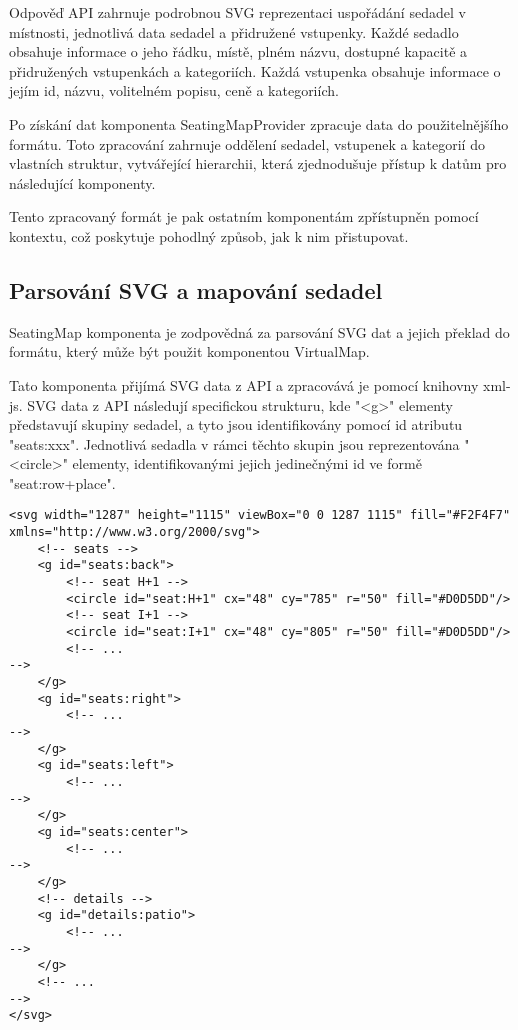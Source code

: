 Odpověď API zahrnuje podrobnou SVG reprezentaci uspořádání sedadel v místnosti, jednotlivá data sedadel a přidružené vstupenky.
Každé sedadlo obsahuje informace o jeho řádku, místě, plném názvu, dostupné kapacitě a přidružených vstupenkách a kategoriích.
Každá vstupenka obsahuje informace o jejím id, názvu, volitelném popisu, ceně a kategoriích.

Po získání dat komponenta SeatingMapProvider zpracuje data do použitelnějšího formátu.
Toto zpracování zahrnuje oddělení sedadel, vstupenek a kategorií do vlastních struktur, vytvářející hierarchii, která zjednodušuje přístup k datům pro následující komponenty.

Tento zpracovaný formát je pak ostatním komponentám zpřístupněn pomocí kontextu, což poskytuje pohodlný způsob, jak k nim přistupovat.

\subsection{Parsování SVG a mapování sedadel}
\label{subsec:implementace-seating-svg}
SeatingMap komponenta je zodpovědná za parsování SVG dat a jejich překlad do formátu, který může být použit komponentou VirtualMap.

Tato komponenta přijímá SVG data z API a zpracovává je pomocí knihovny xml-js.
SVG data z API následují specifickou strukturu, kde "<g>" elementy představují skupiny sedadel, a tyto jsou identifikovány pomocí id atributu "seats:xxx".
Jednotlivá sedadla v rámci těchto skupin jsou reprezentována "<circle>" elementy, identifikovanými jejich jedinečnými id ve formě "seat:row+place".

\begin{verbatim}
<svg width="1287" height="1115" viewBox="0 0 1287 1115" fill="#F2F4F7" xmlns="http://www.w3.org/2000/svg">
    <!-- seats -->
    <g id="seats:back">
        <!-- seat H+1 -->
        <circle id="seat:H+1" cx="48" cy="785" r="50" fill="#D0D5DD"/>
        <!-- seat I+1 -->
        <circle id="seat:I+1" cx="48" cy="805" r="50" fill="#D0D5DD"/>
        <!-- ...
-->
    </g>
    <g id="seats:right">
        <!-- ...
-->
    </g>
    <g id="seats:left">
        <!-- ...
-->
    </g>
    <g id="seats:center">
        <!-- ...
-->
    </g>
    <!-- details -->
    <g id="details:patio">
        <!-- ...
-->
    </g>
    <!-- ...
-->
</svg>
\end{verbatim}

